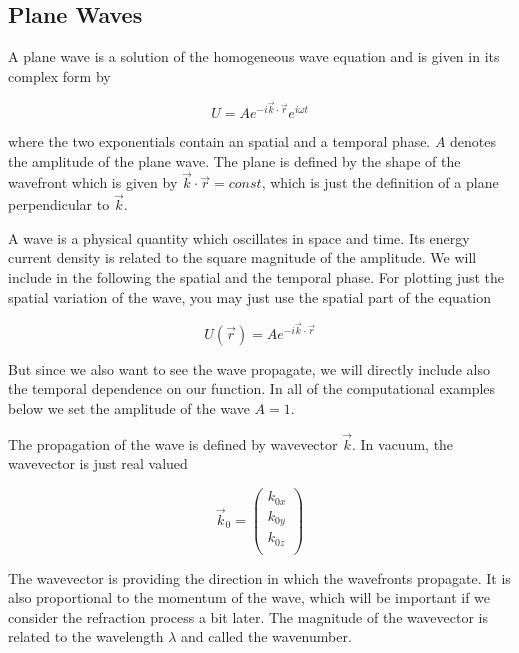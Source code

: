 \documentclass[letterpaper,10pt,english]{sphinxmanual}
\begin{document}
\subsection{Plane Waves}
\label{\detokenize{snippets/Wave Explorer:Plane-Waves}}
A plane wave is a solution of the homogeneous wave equation and is given in its complex form by

\begin{equation}
U=Ae^{-i\vec{k}\cdot \vec{r}}e^{i\omega t}
\end{equation}

where the two exponentials contain an spatial and a temporal phase. \(A\) denotes the amplitude of the plane wave. The plane is defined by the shape of the wavefront which is given by \(\vec{k}\cdot \vec{r}=const\), which is just the definition of a plane perpendicular to \(\vec{k}\).

A wave is a physical quantity which oscillates in space and time. Its energy current density is related to the square magnitude of the amplitude. We will include in the following the spatial and the temporal phase. For plotting just the spatial variation of the wave, you may just use the spatial part of the equation

\begin{equation}
U(\vec{r})=Ae^{-i\vec{k}\cdot \vec{r}}
\end{equation}

But since we also want to see the wave propagate, we will directly include also the temporal dependence on our function. In all of the computational examples below we set the amplitude of the wave \(A=1\).

The propagation of the wave is defined by wavevector \(\vec{k}\). In vacuum, the wavevector is just real valued

\begin{equation}
\vec{k}_{0}=
\begin{pmatrix}
k_{0x} \\
k_{0y}\\
k_{0z}\\
\end{pmatrix}
\end{equation}

The wavevector is providing the direction in which the wavefronts propagate. It is also proportional to the momentum of the wave, which will be important if we consider the refraction process a bit later. The magnitude of the wavevector is related to the wavelength \(\lambda\) and called the wavenumber.
\end{document}
